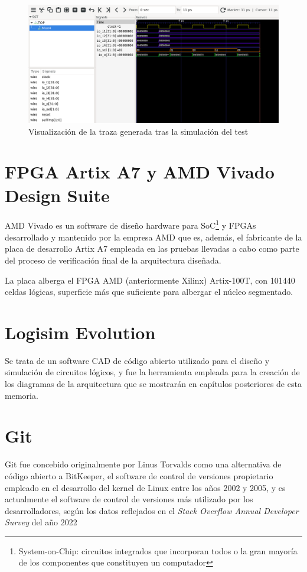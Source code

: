 \vspace{+0.5cm}
\begin{figure}[h]
  \centering
  \includegraphics[width=0.8\linewidth]{res/img/test_mux4_gtkwave.png}
  \caption{Visualización de la traza generada tras la simulación del test}
\end{figure}

\section{FPGA Artix A7 y AMD Vivado Design Suite}

AMD Vivado es un software de diseño hardware para SoC\footnote{System-on-Chip: circuitos integrados que incorporan todos o la gran mayoría de los componentes que constituyen un computador} y FPGAs desarrollado y mantenido por la empresa AMD que es, además, el fabricante de la placa de desarrollo Artix A7 empleada en las pruebas llevadas a cabo como parte del proceso de verificación final de la arquitectura diseñada.

La placa alberga el FPGA AMD (anteriormente Xilinx) Artix-100T, con 101440 celdas lógicas\cite{arty}, superficie más que suficiente para albergar el núcleo segmentado.

\section{Logisim Evolution}

Se trata de un software CAD de código abierto utilizado para el diseño y simulación de circuitos lógicos, y fue la herramienta empleada para la creación de los diagramas de la arquitectura que se mostrarán en capítulos posteriores de esta memoria.

\section{Git}

Git fue concebido originalmente por Linus Torvalds como una alternativa de código abierto a BitKeeper, el software de control de versiones propietario empleado en el desarrollo del kernel de Linux entre los años 2002 y 2005\cite{githistory}, y es actualmente el software de control de versiones más utilizado por los desarrolladores, según los datos reflejados en el \textit{Stack Overflow Annual Developer Survey} del año 2022\cite{stackoverflow}